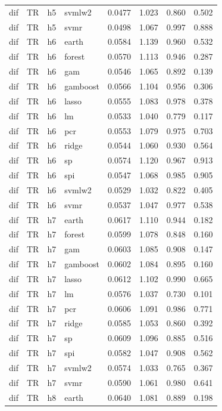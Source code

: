 \begin{ThreePartTable}
\begin{longtable}[t]{llclcccc}
dif & TR & h5 & svmlw2 & 0.0477 & 1.023 & 0.860 & 0.502\\
dif & TR & h5 & svmr & 0.0498 & 1.067 & 0.997 & 0.888\\
\addlinespace
dif & TR & h6 & earth & 0.0584 & 1.139 & 0.960 & 0.532\\
dif & TR & h6 & forest & 0.0570 & 1.113 & 0.946 & 0.287\\
dif & TR & h6 & gam & 0.0546 & 1.065 & 0.892 & 0.139\\
dif & TR & h6 & gamboost & 0.0566 & 1.104 & 0.956 & 0.306\\
dif & TR & h6 & lasso & 0.0555 & 1.083 & 0.978 & 0.378\\
dif & TR & h6 & lm & 0.0533 & 1.040 & 0.779 & 0.117\\
dif & TR & h6 & pcr & 0.0553 & 1.079 & 0.975 & 0.703\\
dif & TR & h6 & ridge & 0.0544 & 1.060 & 0.930 & 0.564\\
dif & TR & h6 & sp & 0.0574 & 1.120 & 0.967 & 0.913\\
dif & TR & h6 & spi & 0.0547 & 1.068 & 0.985 & 0.905\\
dif & TR & h6 & svmlw2 & 0.0529 & 1.032 & 0.822 & 0.405\\
dif & TR & h6 & svmr & 0.0537 & 1.047 & 0.977 & 0.538\\
\addlinespace
dif & TR & h7 & earth & 0.0617 & 1.110 & 0.944 & 0.182\\
dif & TR & h7 & forest & 0.0599 & 1.078 & 0.848 & 0.160\\
dif & TR & h7 & gam & 0.0603 & 1.085 & 0.908 & 0.147\\
dif & TR & h7 & gamboost & 0.0602 & 1.084 & 0.895 & 0.160\\
dif & TR & h7 & lasso & 0.0612 & 1.102 & 0.990 & 0.665\\
dif & TR & h7 & lm & 0.0576 & 1.037 & 0.730 & 0.101\\
dif & TR & h7 & pcr & 0.0606 & 1.091 & 0.986 & 0.771\\
dif & TR & h7 & ridge & 0.0585 & 1.053 & 0.860 & 0.392\\
dif & TR & h7 & sp & 0.0609 & 1.096 & 0.885 & 0.516\\
dif & TR & h7 & spi & 0.0582 & 1.047 & 0.908 & 0.562\\
dif & TR & h7 & svmlw2 & 0.0574 & 1.033 & 0.765 & 0.367\\
dif & TR & h7 & svmr & 0.0590 & 1.061 & 0.980 & 0.641\\
\addlinespace
dif & TR & h8 & earth & 0.0640 & 1.081 & 0.889 & 0.198\\

\end{longtable}
\end{ThreePartTable}

